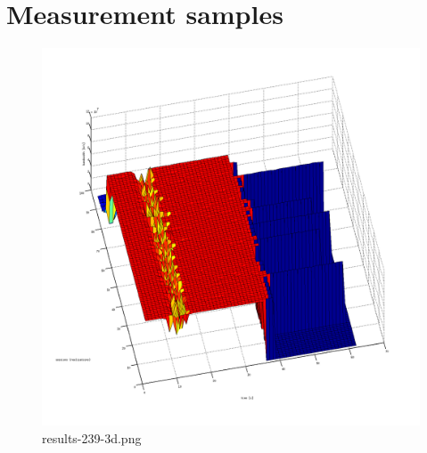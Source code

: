 
\section{Measurement samples}
\label{appendix:measurement-samples}
\begin{figure}[htb]
	\begin{center}
	\includegraphics[width=\textwidth]{results-239-3d.png}
	\end{center}
	\caption{results-239-3d.png}
	\label{img:results-239-3d.png}
\end{figure}

